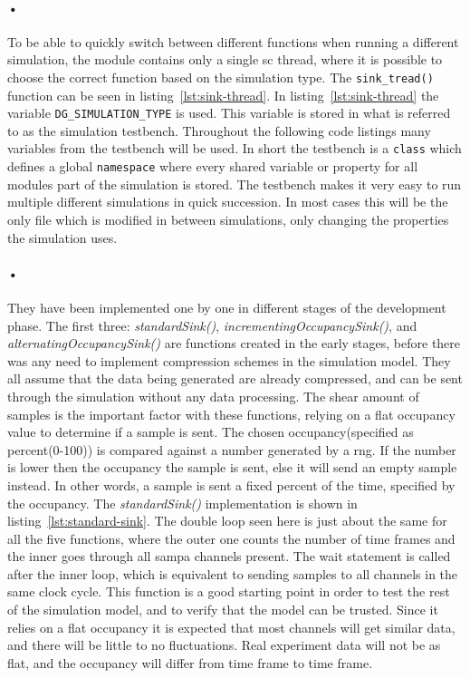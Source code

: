 \documentclass[a4paper, 12pt]{report}\dfrac{\right }{•}
\newcommand{\codeword}[1]{\texttt{#1}}
\begin{document}
\paragraph{•} 
To be able to quickly switch between different functions when running a different simulation, the module contains only a single \gls{sc} thread, where it is possible to choose the correct function based on the simulation type.
The \codeword{sink\_tread()} function can be seen in listing~\ref{lst:sink-thread}.
In listing~\ref{lst:sink-thread} the variable \codeword{DG\_SIMULATION\_TYPE} is used.
This variable is stored in what is referred to as the simulation testbench.
Throughout the following code listings many variables from the testbench will be used.
In short the testbench is a \codeword{class} which defines a global \codeword{namespace} where every shared variable or property for all modules part of the simulation is stored.
The testbench makes it very easy to run multiple different simulations in quick succession.
In most cases this will be the only file which is modified in between simulations, only changing the properties the simulation uses.

\begin{minipage}{\linewidth}

\end{minipage}

\paragraph{•}
They have been implemented one by one in different stages of the development phase.
The first three: \textit{standardSink()}, \textit{incrementingOccupancySink()}, and \textit{alternatingOccupancySink()} are functions created in the early stages, before there was any need to implement compression schemes in the simulation model.
They all assume that the data being generated are already compressed, and can be sent through the simulation without any data processing.
The shear amount of samples is the important factor with these functions, relying on a flat occupancy value to determine if a sample is sent.
The chosen occupancy(specified as percent(0-100)) is compared against a number generated by a \gls{rng}.
If the number is lower then the occupancy the sample is sent, else it will send an empty sample instead.
In other words, a sample is sent a fixed percent of the time, specified by the occupancy.
The \textit{standardSink()} implementation is shown in listing~\ref{lst:standard-sink}.
The double loop seen here is just about the same for all the five functions, where the outer one counts the number of time frames and the inner goes through all \gls{sampa} channels present.
The wait statement is called after the inner loop, which is equivalent to sending samples to all channels in the same clock cycle.
This function is a good starting point in order to test the rest of the simulation model, and to verify that the model can be trusted.
Since it relies on a flat occupancy it is expected that most channels will get similar data, and there will be little to no fluctuations.
Real experiment data will not be as flat, and the occupancy will differ from time frame to time frame.
\end{document}

